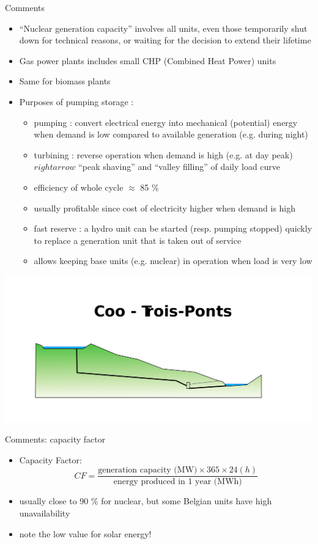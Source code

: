 \begin{frame}[allowframebreaks]{Comments}
\begin{itemize}
\item “Nuclear generation capacity” involves all units, even those temporarily shut down for technical reasons, or waiting for the decision to extend their lifetime
\item Gas power plants includes small CHP (Combined Heat Power) units
\item Same for biomass plants
\item Purposes of pumping storage :
\begin{itemize}
\item pumping : convert electrical energy into mechanical (potential) energy when demand is low compared to available generation (e.g. during night)
\item turbining : reverse operation when demand is high (e.g. at day peak) $rightarrow$ “peak shaving” and “valley filling” of daily load curve
\item efficiency of whole cycle $\approx$ 85 \%
\item usually profitable since cost of electricity higher when demand is high
\item fast reserve : a hydro unit can be started (resp. pumping stopped) quickly to replace a generation unit that is taken out of service
\item allows keeping base units (e.g. nuclear) in operation when load is very low
\end{itemize}
\end{itemize}
\begin{center}
\includegraphics[width=0.4\linewidth]{images/Coo-Trois-Ponts.svg.png}
\end{center}
\end{frame}

\begin{frame}{Comments: capacity factor}
\begin{itemize}
\item Capacity Factor: 
$$CF = \frac{\text{generation capacity (MW)} \times 365 \times 24(h)}{\text{energy produced in 1 year (MWh)}} $$

\item usually close to 90 \% for nuclear, but some Belgian units have high unavailability
\item note the low value for solar energy!
\end{itemize}
\end{frame}


